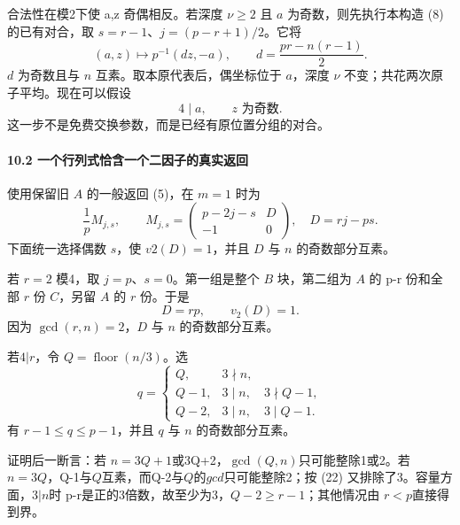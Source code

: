 \documentclass[11pt,a4paper]{article}
\theoremstyle{definition}
\numberwithin{equation}{section}
\begin{document}
{合法性在模2下使} {a,z} {奇偶相反。若深度} {\ensuremath{\nu \ge 2}} {且} {\ensuremath{a}} {为奇数，则先执行本构造} {(8)} {的已有对合，取} {\ensuremath{s=r-1}、\ensuremath{j=(p-r+1)/2}。它将} \[
(a,z)\longmapsto p^{-1}(d z,-a),\qquad
d=\frac{pr-n(r-1)}2.
\] {\ensuremath{d}} {为奇数且与} {\ensuremath{n}} {互素。取本原代表后，偶坐标位于} {\ensuremath{a}，深度} {\ensuremath{\nu }} {不变；共花两次原子平均。现在可以假设} \[
4\mid a,\qquad z\text{ 为奇数}.
\tag{C9.20}
\] {这一步不是免费交换参数，而是已经有原位置分组的对合。}

\paragraph*{\texorpdfstring{{10.2} {一个行列式恰含一个二因子的真实返回}}{10.2 一个行列式恰含一个二因子的真实返回}}\label{C9-h72}

{使用保留旧} {\ensuremath{A}} {的一般返回} {(5)，在} {\ensuremath{m=1}} {时为} \[
\frac1pM_{j,s},\qquad
M_{j,s}=
\begin{pmatrix}
p-2j-s&D\\-1&0
\end{pmatrix},\quad D=rj-ps.
\tag{C9.21}
\] {下面统一选择偶数} {\ensuremath{s}，使} {\ensuremath{v2(D)=1}，并且} {\ensuremath{D}} {与} {\ensuremath{n}} {的奇数部分互素。}

{若} {\ensuremath{r=2}} {模4，取} {\ensuremath{j=p}、\ensuremath{s=0}。第一组是整个} {\ensuremath{B}} {块，第二组为} {\ensuremath{A}} {的} {p-r} {份和全部} {\ensuremath{r}} {份} {\ensuremath{C}，另留} {\ensuremath{A}} {的} {\ensuremath{r}} {份。于是} \[
D=rp,\qquad v_2(D)=1.
\] {因为} {\ensuremath{\operatorname{gcd}(r,n)=2}，\ensuremath{D}} {与} {\ensuremath{n}} {的奇数部分互素。}

{若\ensuremath{4|r}，令} {\ensuremath{Q=\operatorname{floor}(n/3)}。选} \[
q=\begin{cases}
Q,&3\nmid n,\\
Q-1,&3\mid n,\quad3\nmid Q-1,\\
Q-2,&3\mid n,\quad3\mid Q-1.
\end{cases}
\tag{C9.22}
\] {有} {\ensuremath{r-1\le q\le p-1}，并且} {\ensuremath{q}} {与} {\ensuremath{n}} {的奇数部分互素。}

{证明后一断言：若} {\ensuremath{n=3Q+1}或3Q+2，\ensuremath{\operatorname{gcd}(Q,n)}只可能整除1或2。若} {\ensuremath{n=3Q}，Q-1与\ensuremath{Q}互素，而Q-2与\ensuremath{Q}的\ensuremath{gcd}只可能整除2；按} {(22)} {又排除了3。容量方面，\ensuremath{3|n}时} {p-r是正的3倍数，故至少为3，\ensuremath{Q-2\ge r-1}；其他情况由} {\ensuremath{r<p}直接得到界。}
\end{document}
